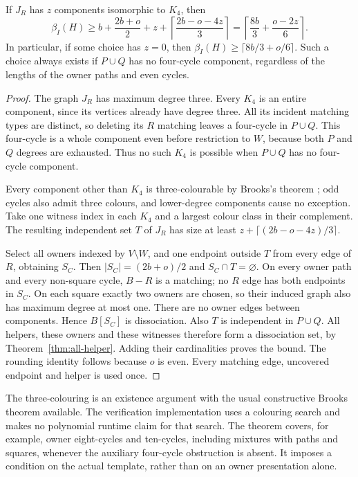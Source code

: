 \begin{theorem}\label{thm:owner-matching}
If $J_R$ has $z$ components isomorphic to $K_4$, then
\[
 \beta_I(H)\ge
 b+\frac{2b+o}{2}+z+
       \left\lceil\frac{2b-o-4z}{3}\right\rceil
 =\left\lceil\frac{8b}{3}+\frac{o-2z}{6}\right\rceil.
\]
In particular, if some choice has $z=0$, then
$\beta_I(H)\ge\lceil8b/3+o/6\rceil$.
Such a choice always exists if $P\cup Q$ has no four-cycle component,
regardless of the lengths of the owner paths and even cycles.
\end{theorem}
\begin{proof}
The graph $J_R$ has maximum degree three. Every $K_4$ is an entire component,
since its vertices already have degree three. All its incident matching types
are distinct, so deleting its $R$ matching leaves a four-cycle in $P\cup Q$.
This four-cycle is a whole component even before restriction to $W$, because
both $P$ and $Q$ degrees are exhausted. Thus no such $K_4$ is possible when
$P\cup Q$ has no four-cycle component.

Every component other than $K_4$ is three-colourable by Brooks's theorem
\cite{brooks}; odd cycles also admit three colours, and lower-degree
components cause no exception. Take one witness index in each $K_4$ and a
largest colour class in their complement. The resulting independent set $T$
of $J_R$ has size at least
$z+\lceil(2b-o-4z)/3\rceil$.

Select all owners indexed by $V\setminus W$, and one endpoint outside $T$
from every edge of $R$, obtaining $S_C$. Then
$|S_C|=(2b+o)/2$ and $S_C\cap T=\varnothing$.
On every owner path and every non-square cycle, $B-R$ is a matching;
no $R$ edge has both endpoints in $S_C$. On each square exactly two owners
are chosen, so their induced graph also has maximum degree at most one.
There are no owner edges between components. Hence $B[S_C]$ is dissociation.
Also $T$ is independent in $P\cup Q$. All helpers, these owners and these
witnesses therefore form a dissociation set, by Theorem~\ref{thm:all-helper}.
Adding their cardinalities proves the bound. The rounding identity follows
because $o$ is even. Every matching edge, uncovered endpoint and helper is
used once.
\end{proof}

The three-colouring is an existence argument with the usual constructive
Brooks theorem available. The verification implementation uses a colouring
search and makes no polynomial runtime claim for that search.
The theorem covers, for example, owner eight-cycles and ten-cycles, including
mixtures with paths and squares, whenever the auxiliary four-cycle obstruction
is absent. It imposes a condition on the actual template, rather than on an
owner presentation alone.

